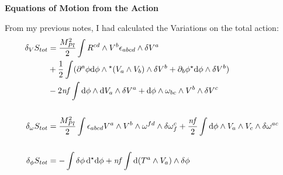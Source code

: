 \documentclass[12pt]{article}
\newcommand{\hodge}{{^\star}}
\begin{document}
\begin{center}
  \Large\textbf{Equations of Motion from the Action} \\
  \large{}
\end{center}

From my previous notes, I had calculated the Variations on the total action:
\begin{align}
  \var_V{S_{tot}} &= \frac{M_{Pl}^2}{2}\int R^{cd} \wedge V^b \epsilon_{abcd} \wedge \var V^a \nonumber \\ &+ \frac{1}{2} \int (\partial^a\phi \dd\phi \wedge \hodge(V_a \wedge V_b) \wedge \var{V^b} + \partial_b\phi \hodge\dd\phi \wedge \var{V^b}) \nonumber \\ &-2\mathit{nf} \int \dd\phi \wedge \dd V_a \wedge \var{V^a} + \dd\phi \wedge \omega_{bc} \wedge V^b \wedge \var{V^c} \\ \nonumber \\
  \var_\omega{S_{tot}} &= \frac{M_{Pl}^2}{2} \int \epsilon_{abcd} V^a \wedge V^b \wedge \omega^{fd} \wedge \var{\omega^c_f} + \frac{\mathit{nf}}{2} \int \dd{\phi} \wedge V_a \wedge V_c \wedge \var{\omega^{ac}} \\ \nonumber \\
  \var_\phi{S_{tot}} &= - \int \var{\phi}\dd{\hodge{\dd{\phi}}} + \mathit{nf} \int \dd(T^a \wedge V_a) \wedge \var{\phi}
\end{align}
\end{document}
